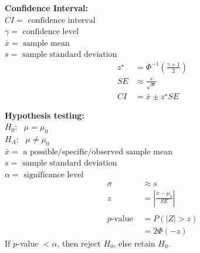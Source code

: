 \documentclass[12pt,letterpaper,addpoints]{exam}
\begin{document}
\begin{multicols}{2}
{\bf Confidence Interval:}\\
$CI = \text{ confidence interval}$\\
$\gamma = \text{ confidence level}$\\
$\bar{x} = \text{ sample mean}$ \\
$s = \text{ sample standard deviation}$ 
\begin{align*}
z^{\star} &= \Phi^{-1}\left(\frac{\gamma+1}{2} \right) \\
SE &\approx \frac{s}{\sqrt{n}}\\
CI &= \bar{x} \pm z^{\star} SE
\end{align*}

{\bf Hypothesis testing:}\\
$H_0:~~~\mu = \mu_0$\\
$H_A:~~~\mu \ne \mu_0$\\
$\bar{x} = \text{ a possible/specific/observed sample mean}$\\
$s = \text{ sample standard deviation}$\\
$\alpha = \text{ significance level} $
\begin{align*}
\sigma &\approx s\\
z &= \left| \frac{\bar{x}-\mu_0}{SE} \right|\\\\
p\text{-value } &= P\left(\lvert Z \rvert > z  \right)\\
&= 2 \Phi\left( -z \right)
\end{align*}
If $p$-value $< \alpha$, then reject $H_0$, else retain $H_0$.


\end{multicols}
\end{document}
